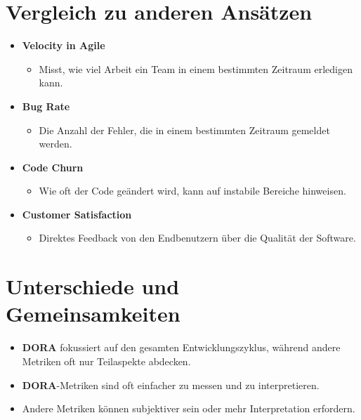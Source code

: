 \documentclass{orgstandard}
\begin{document}
\section{Vergleich zu anderen Ansätzen}
\label{sec:orged69077}
\begin{itemize}
\item \textbf{Velocity in Agile}
\begin{itemize}
\item Misst, wie viel Arbeit ein Team in einem bestimmten Zeitraum erledigen kann.
\end{itemize}
\item \textbf{Bug Rate}
\begin{itemize}
\item Die Anzahl der Fehler, die in einem bestimmten Zeitraum gemeldet werden.
\end{itemize}
\item \textbf{Code Churn}
\begin{itemize}
\item Wie oft der Code geändert wird, kann auf instabile Bereiche hinweisen.
\end{itemize}
\item \textbf{Customer Satisfaction}
\begin{itemize}
\item Direktes Feedback von den Endbenutzern über die Qualität der Software.
\end{itemize}
\end{itemize}

\section{Unterschiede und Gemeinsamkeiten}
\label{sec:org3cae60d}
\begin{itemize}
\item \textbf{DORA} fokussiert auf den gesamten Entwicklungszyklus, während andere Metriken oft nur Teilaspekte abdecken.
\item \textbf{DORA}-Metriken sind oft einfacher zu messen und zu interpretieren.
\item Andere Metriken können subjektiver sein oder mehr Interpretation erfordern.
\end{itemize}
\end{document}
